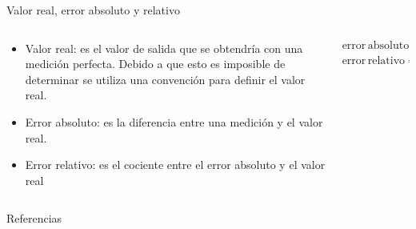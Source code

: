 \documentclass[aspectratio=169]{beamer}
\begin{document}
\begin{frame}{Valor real, error absoluto y relativo}
    \begin{columns}[c, onlytextwidth]
        \begin{column}{0.55\textwidth}
            \begin{itemize}
                \item Valor real: es el valor de salida que se obtendría con una medición perfecta. Debido a que esto es imposible de determinar se utiliza una convención para definir el valor real.  
                \item Error absoluto: es la diferencia entre una medición y el valor real. 
                \item Error relativo: es el cociente entre el error absoluto y el valor real
            \end{itemize}
        \end{column}
        \begin{column}{0.40\textwidth}
            \begin{equation*}
                \mathrm{error\,absoluto} = \mathrm{medición} - \mathrm{valor\,real}
            \end{equation*}
            \begin{equation*}
                \mathrm{error\,relativo} = \dfrac{\mathrm{error\,absoluto}}{\mathrm{valor\,real}}
            \end{equation*}
        \end{column}
    \end{columns}
\end{frame}

\begin{frame}{Referencias}
\footnotesize
\printbibliography[heading=none]
\end{frame}
\end{document}
